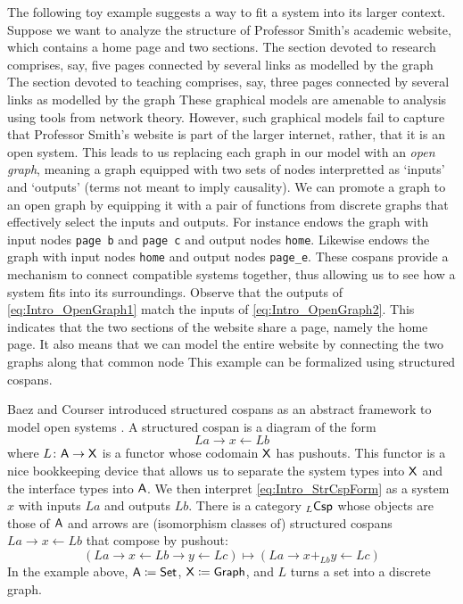 \documentclass{amsart}
\begin{document}
The following toy example suggests a way to fit a system
into its larger context. Suppose we want to analyze the
structure of Professor Smith's academic website, which
contains a home page and two sections. The section devoted
to research comprises, say, five pages connected by several
links as modelled by the graph
 The section devoted to
teaching comprises, say, three pages connected by several
links as modelled by the graph
 These graphical models
are amenable to analysis using tools from network
theory. However, such graphical models fail to capture that
Professor Smith's website is part of the larger internet,
rather, that it is an open system. This leads to us
replacing each graph in our model with an \emph{open graph},
meaning a graph equipped with two sets of nodes interpretted
as `inputs' and `outputs' (terms not meant to imply
causality). We can promote a graph to an open graph by
equipping it with a pair of functions from discrete graphs
that effectively select the inputs and outputs. For instance
 endows the graph with
input nodes \texttt{page b} and \texttt{page c} and output
nodes \texttt{home}. Likewise
 endows the graph with
input nodes \texttt{home} and output nodes \texttt{page\_e}.
These cospans provide a mechanism to connect compatible
systems together, thus allowing us to see how a system fits
into its surroundings. Observe that the outputs of
\eqref{eq:Intro_OpenGraph1} match the inputs of
\eqref{eq:Intro_OpenGraph2}. This indicates that the two
sections of the website share a page, namely the home page.
It also means that we can model the entire website by
connecting the two graphs along that common node
 This example can be
formalized using structured cospans.

Baez and Courser introduced structured cospans as
an abstract framework to model open systems
\cite{bc_strCsp}. A structured cospan is a diagram
of the form
\begin{equation}\label{eq:Intro_StrCspForm}
  La \to x \gets Lb
\end{equation}
where $ L \colon \mathsf{A} \to \mathsf{X} $ is a functor whose
codomain $ \mathsf{X} $ has pushouts. This functor is a
nice bookkeeping device that allows us to separate
the system types into $ \mathsf{X} $ and the interface
types into $ \mathsf{A} $.  We then interpret
\eqref{eq:Intro_StrCspForm} as a system $ x $ with
inputs $ La $ and outputs $ Lb $. There is a
category $ _L\mathsf{Csp} $ whose objects are those of
$ \mathsf{A} $ and arrows are (isomorphism classes of) structured cospans
$ La \to x \gets Lb $ that compose by pushout:
$$(La \to x \gets Lb \to y \gets Lc) \mapsto (La \to x +_{Lb}y
\gets Lc)$$ In the example above,
$ \mathsf{A} \coloneqq \mathsf{Set} $, $ \mathsf{X} \coloneqq \mathsf{Graph} $, and
$ L $ turns a set into a discrete graph.
\end{document}
